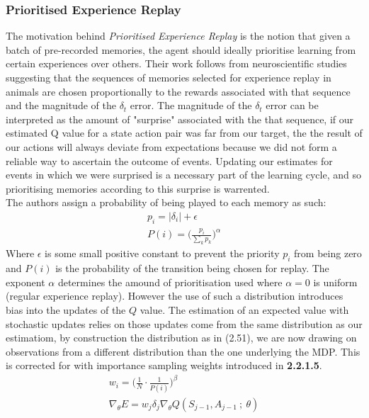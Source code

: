 \subsubsection{Prioritised Experience Replay}
The motivation behind \emph{Prioritised Experience Replay} \cite{Schaul2015} is the notion that given
a batch of pre-recorded memories, the agent should ideally prioritise learning 
from certain experiences over others. Their work follows from neuroscientific studies
suggesting that the sequences of memories selected for experience replay in animals
are chosen proportionally to the rewards associated with that sequence and the magnitude of the
$\delta_t$ error. The magnitude of the $\delta_t$ error can be interpreted as the amount of "surprise"
associated with the that sequence, if our estimated Q value for a state action pair was far
from our target, the the result of our actions will always deviate from expectations because we did not
form a reliable way to ascertain the outcome of events. Updating our estimates for events in which
we were surprised is a necessary part of the learning cycle, and so prioritising memories according
to this surprise is warrented.\\
The authors assign a probability of being played to each memory as such:
\begin{equation}
    \begin{gathered}
        p_i = \vert \delta_i \vert + \epsilon \\
        P(i) = \biggl(\frac{p_i}{\sum_k p_k}\biggl)^\alpha
    \end{gathered}
\end{equation}
Where $\epsilon$ is some small positive constant to prevent the priority $p_i$ from being zero
and $P(i)$ is the probability of the transition being chosen for replay. The exponent $\alpha$
determines the amound of prioritisation used where $\alpha = 0$ is uniform (regular experience replay).
However the use of such a distribution introduces bias into the updates of the $Q$ value. The estimation
of an expected value with stochastic updates relies on those updates come from the same distribution as
our estimatiom, by construction the distribution as in (2.51), we are now drawing on observations
from a different distribution than the one underlying the MDP. This is corrected for with 
importance sampling weights introduced in \textbf{2.2.1.5}.
\begin{equation}
    \begin{gathered}
        w_i = \biggl(\frac{1}{N}\cdot \frac{1}{P(i)} \biggl)^\beta \\
        \nabla_\theta E = w_j \delta_j \nabla_\theta Q(S_{j-1}, A_{j-1}\:; \: \theta)
    \end{gathered}
\end{equation}
